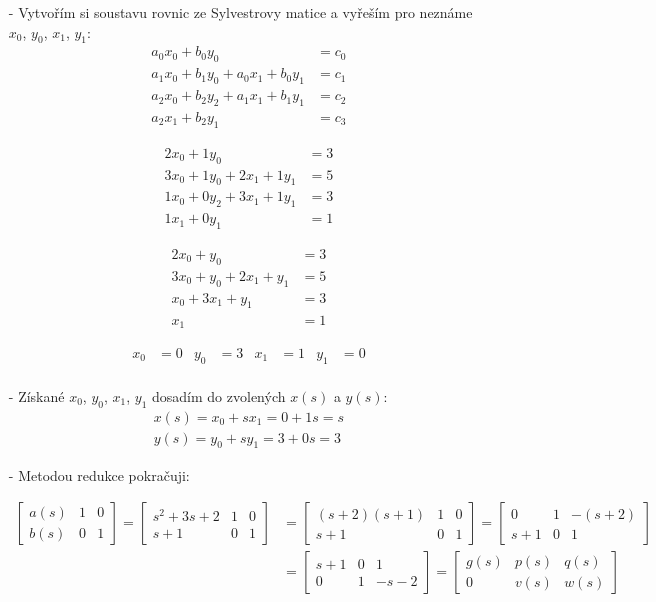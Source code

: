 \documentclass{article}
\newcommand\mat[1]{\begin{bmatrix}#1\end{bmatrix}}
\begin{document}
\begin{itemize}
    \item[-] Vytvořím si soustavu rovnic ze Sylvestrovy matice a vyřeším pro neznáme $x_0$, $y_0$, $x_1$, $y_1$:
    \begin{align*}
        a_0x_0+b_0y_0 &= c_0\\
        a_1x_0+b_1y_0+a_0x_1+b_0y_1 &= c_1\\
        a_2x_0+b_2y_2+a_1x_1+b_1y_1 &= c_2\\
        a_2x_1+b_2y_1 &= c_3
    \end{align*}
    
    \begin{align*}
        2x_0+1y_0 &= 3\\
        3x_0+1y_0+2x_1+1y_1 &= 5\\
        1x_0+0y_2+3x_1+1y_1 &= 3\\
        1x_1+0y_1 &= 1
    \end{align*}
    
    \begin{align*}
        2x_0+y_0 &= 3\\
        3x_0+y_0+2x_1+y_1 &= 5\\
        x_0+3x_1+y_1 &= 3\\
        x_1 &= 1
    \end{align*}
    
    \begin{align*}
        x_0 &= 0 & y_0 &= 3 & x_1 &= 1 & y_1 &= 0\\
    \end{align*}
    \item[-] Získané $x_0$, $y_0$, $x_1$, $y_1$ dosadím do zvolených $x(s)$ a $y(s)$:
    \begin{align*}
        x(s) = x_0 + sx_1 = 0 + 1s = s\\
        y(s) = y_0 + sy_1 = 3 + 0s = 3
    \end{align*}

    \item[-] Metodou redukce pokračuji: 

    \begin{align*}
        \mat{a(s) & 1 & 0\\ b(s) & 0 & 1} = \mat{s^2+3s+2 & 1 & 0\\s+1 & 0 & 1} &=  \mat{(s+2)(s+1) & 1 & 0\\s+1 & 0 & 1} = \mat{0 & 1 & -(s+2)\\s+1 & 0 & 1} \\ &= \mat{s+1 & 0 & 1\\0 & 1 & -s-2} = \mat{g(s) & p(s) & q(s)\\ 0 & v(s) & w(s)}
    \end{align*}
    

\end{itemize}
\end{document}

